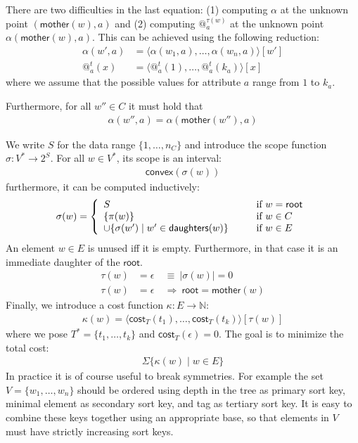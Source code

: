 \documentclass{article}
\makeatletter
\newcommand{\NAT}{{\mathbb N}}
\newcommand{\SET}[1]{{\{{#1}\}}}
\newcommand{\COST}{{\textsf{cost}}}
\newcommand{\TO}{\rightarrow}
\newcommand{\ROOT}{{\textsf{root}}}
\newcommand{\MOTHER}{{\textsf{mother}}}
\newcommand{\DAUGHTERS}{{\textsf{daughters}}}
\newcommand{\UNION}{\cup}
\newcommand{\TUP}[1]{{\langle{#1}\rangle}}
\newcommand{\EPS}{\epsilon}
\newcommand{\AT}[2]{@^{#1}_{#2}}
\newcommand{\CONVEX}{{\textsf{convex}}}
\newcommand{\IMPLIES}{\Rightarrow}
\makeatother
\begin{document}
There are two difficulties in the last equation: (1) computing
$\alpha$ at the unknown point $(\MOTHER(w),a)$ and (2) computing
$\AT{\tau(w)}{a}$ at the unknown point $\alpha(\MOTHER(w),a)$.  This
can be achieved using the following reduction:
\begin{align*}
\alpha(w',a) &= \TUP{\alpha(w_1,a),\ldots,\alpha(w_n,a)}[w']\\
\AT{t}{a}(x) &= \TUP{\AT{t}{a}(1),\ldots,\AT{t}{a}(k_a)}[x]
\end{align*}
where we assume that the possible values for attribute $a$ range from
$1$ to $k_a$.

Furthermore, for all $w''\in C$ it must hold that
\begin{gather*}
\alpha(w'',a) = \alpha(\MOTHER(w''),a)
\end{gather*}

We write $S$ for the data range $\SET{1,\ldots,n_C}$ and introduce the
scope function $\sigma:V^*\TO 2^S$.  For all $w\in V^*$, its scope is
an interval:
\begin{gather*}
\CONVEX(\sigma(w))
\end{gather*}
furthermore, it can be computed inductively:
\begin{gather*}
\sigma(w) = \left\{
\begin{array}{l@{\hspace{1cm}}l}
S & \text{if } w=\ROOT\\
\SET{\pi(w)} & \text{if } w\in C\\
{\UNION}\SET{\sigma(w')\mid w'\in\DAUGHTERS(w)} & \text{if } w\in E
\end{array}
\right.
\end{gather*}
An element $w\in E$ is unused iff it is empty.  Furthermore, in that
case it is an immediate daughter of the $\ROOT$.
\begin{align*}
\tau(w)&=\EPS\ &\equiv\ |\sigma(w)|=0\\
\tau(w)&=\EPS\ &\IMPLIES\ \ROOT=\MOTHER(w)
\end{align*}
Finally, we introduce a cost function $\kappa:E\TO\NAT$:
\begin{gather*}
\kappa(w) = \TUP{\COST_T(t_1),\ldots,\COST_T(t_k)}[\tau(w)]
\end{gather*}
where we pose $T^*=\SET{t_1,\ldots,t_k}$ and $\COST_T(\EPS)=0$.
The goal is to minimize the total cost:
\begin{gather*}
{\Sigma}\SET{\kappa(w)\mid w\in E}
\end{gather*}
In practice it is of course useful to break symmetries.  For example
the set $V=\SET{w_1,\ldots,w_n}$ should be ordered using depth in the
tree as primary sort key, minimal element as secondary sort key, and
tag as tertiary sort key.  It is easy to combine these keys together
using an appropriate base, so that elements in $V$ must have strictly
increasing sort keys.
\end{document}

